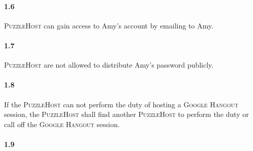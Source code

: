\documentclass{article}
\newcommand{\hangout}{\textsc{Google Hangout}\xspace}
\newcommand{\host}{\textsc{PuzzleHost}\xspace}
\begin{document}
\paragraph{1.6} \host can gain access to Amy's account by emailing to Amy.

\paragraph{1.7} \host are not allowed to distribute Amy's password publicly.

\paragraph{1.8} If the \host can not perform the duty of hosting a \hangout session, the \host shall find another \host to perform the duty or call off the \hangout session.

\paragraph{1.9}

\section{}
\end{document}

